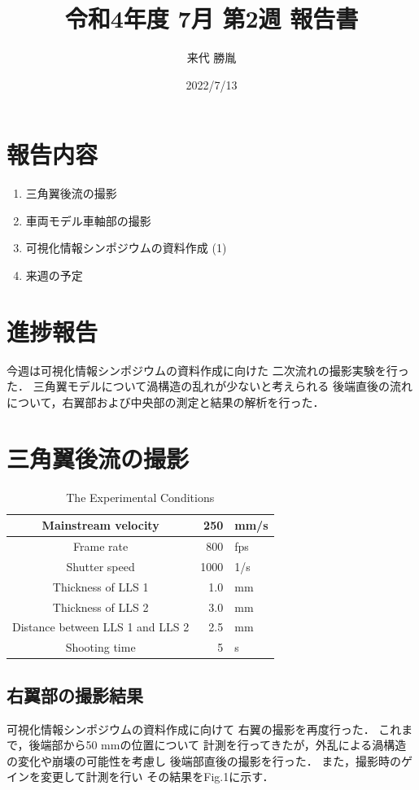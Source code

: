 \documentclass[twocolumn,a4j]{jsarticle}
\author{来代 勝胤}
\title{令和4年度 7月 第2週 報告書}
\date{2022/7/13}
\begin{document}
\columnseprule=0.1mm
\maketitle

\section*{報告内容}
\begin{enumerate}[1.]
  \item 三角翼後流の撮影
  \item 車両モデル車軸部の撮影
  \item 可視化情報シンポジウムの資料作成 (1)
  \item 来週の予定
\end{enumerate}

\section*{進捗報告}
今週は可視化情報シンポジウムの資料作成に向けた
二次流れの撮影実験を行った．
三角翼モデルについて渦構造の乱れが少ないと考えられる
後端直後の流れについて，右翼部および中央部の測定と結果の解析を行った．

\section{三角翼後流の撮影}
\begin{table}[hbtp]
  \centering
  \caption{The Experimental Conditions}
  \begin{tabular}{ c r l }
    \hline
    Mainstream velocity              & 250  & mm/s \\ \hline
    Frame rate                       & 800  & fps  \\ \hline
    Shutter speed                    & 1000 & 1/s  \\ \hline
    Thickness of LLS 1               & 1.0  & mm   \\ \hline
    Thickness of LLS 2               & 3.0  & mm   \\ \hline
    Distance between LLS 1 and LLS 2 & 2.5  & mm   \\ \hline
    Shooting time                    & 5    & s    \\ \hline
  \end{tabular}
\end{table}

\subsection{右翼部の撮影結果}
可視化情報シンポジウムの資料作成に向けて
右翼の撮影を再度行った．
これまで，後端部から50 mmの位置について
計測を行ってきたが，外乱による渦構造の変化や崩壊の可能性を考慮し
後端部直後の撮影を行った．
また，撮影時のゲインを変更して計測を行い
その結果をFig.1に示す．\\
\end{document}
